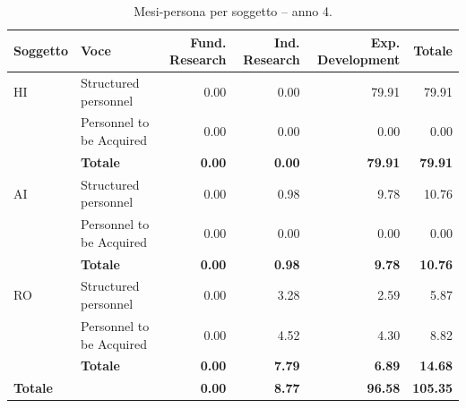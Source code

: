 \documentclass{plan4ari_report}
\begin{document}
\clearpage
\begin{table}[H]\centering\small\caption{Mesi-persona per soggetto -- anno 4.}\label{tab:wp-s-y4}
\begin{tabular}{llrrrr}\toprule\textbf{Soggetto} & \textbf{Voce} & \textbf{Fund. Research} & \textbf{Ind. Research} & \textbf{Exp. Development} & \textbf{Totale} \\\midrule
HI & Structured personnel & 0.00 & 0.00 & 79.91 & 79.91 \\
 & Personnel to be Acquired & 0.00 & 0.00 & 0.00 & 0.00 \\
 & \textbf{Totale} & \textbf{0.00} & \textbf{0.00} & \textbf{79.91} & \textbf{79.91} \\\midrule
AI & Structured personnel & 0.00 & 0.98 & 9.78 & 10.76 \\
 & Personnel to be Acquired & 0.00 & 0.00 & 0.00 & 0.00 \\
 & \textbf{Totale} & \textbf{0.00} & \textbf{0.98} & \textbf{9.78} & \textbf{10.76} \\\midrule
RO & Structured personnel & 0.00 & 3.28 & 2.59 & 5.87 \\
 & Personnel to be Acquired & 0.00 & 4.52 & 4.30 & 8.82 \\
 & \textbf{Totale} & \textbf{0.00} & \textbf{7.79} & \textbf{6.89} & \textbf{14.68} \\\midrule
\textbf{Totale} & & \textbf{0.00} & \textbf{8.77} & \textbf{96.58} & \textbf{105.35} \\
\bottomrule\end{tabular}\end{table}
\end{document}
